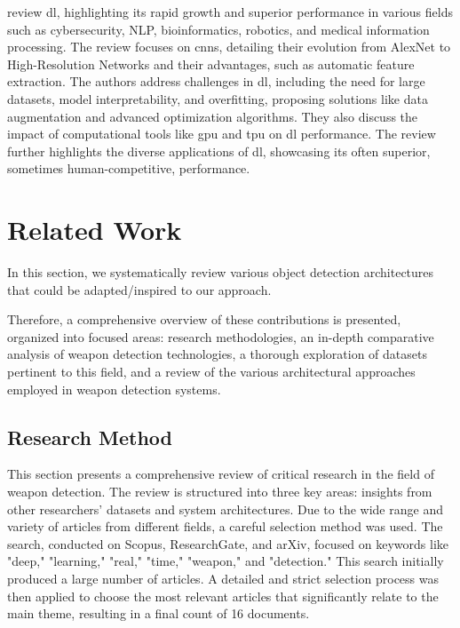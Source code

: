 \citet{rfc10} review \ac{dl}, highlighting its rapid growth and superior 
performance in various 
fields such as cybersecurity, NLP, bioinformatics, robotics, and medical information processing. The review 
focuses on \ac{cnn}s, detailing their evolution from AlexNet to High-Resolution 
Networks and their advantages, such as automatic feature extraction. The authors address challenges in 
\ac{dl}, including the need for large datasets, model interpretability, and overfitting, proposing solutions like 
data augmentation and advanced optimization algorithms. They also discuss the impact of computational tools 
like \ac{gpu} and \ac{tpu} on \ac{dl} performance. The 
review further highlights the diverse applications of \ac{dl}, showcasing its often superior, sometimes 
human-competitive, performance.

\section{Related Work}
In this section, we systematically review various object detection architectures that could be 
adapted/inspired to our approach. 

Therefore, a comprehensive overview of these contributions is presented, organized 
into focused areas: research methodologies, an in-depth comparative analysis of weapon detection technologies, a 
thorough exploration of datasets pertinent to this field, and a review of the various architectural approaches 
employed in weapon detection systems.

\subsection{Research Method}
This section presents a comprehensive review of critical research in the field of weapon detection. 
The review is structured into three key areas: insights from other 
researchers' datasets and system architectures. Due to the wide range 
and variety of articles from different fields, a careful selection method was used. The search, conducted on 
Scopus, ResearchGate, and arXiv, focused on keywords like "deep," "learning," "real," "time," "weapon," and 
"detection." This search initially produced a large number of articles. A detailed and strict selection process 
was then applied to choose the most relevant articles that significantly relate to the main theme, 
resulting in a final count of 16 documents.

